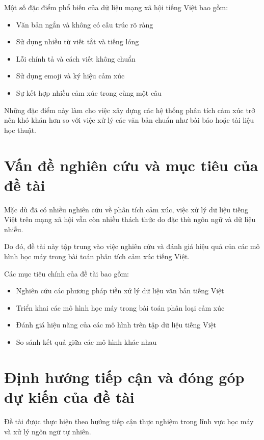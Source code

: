 \documentclass[14pt, a4paper]{report}
\begin{document}
Một số đặc điểm phổ biến của dữ liệu mạng xã hội tiếng Việt bao gồm:

\begin{itemize}
    \item Văn bản ngắn và không có cấu trúc rõ ràng
    \item Sử dụng nhiều từ viết tắt và tiếng lóng
    \item Lỗi chính tả và cách viết không chuẩn
    \item Sử dụng emoji và ký hiệu cảm xúc
    \item Sự kết hợp nhiều cảm xúc trong cùng một câu
\end{itemize}

Những đặc điểm này làm cho việc xây dựng các hệ thống phân tích cảm xúc trở nên khó khăn hơn so với việc xử lý các văn bản chuẩn như bài báo hoặc tài liệu học thuật.

\section{Vấn đề nghiên cứu và mục tiêu của đề tài}

Mặc dù đã có nhiều nghiên cứu về phân tích cảm xúc, việc xử lý dữ liệu tiếng Việt trên mạng xã hội vẫn còn nhiều thách thức do đặc thù ngôn ngữ và dữ liệu nhiễu.

Do đó, đề tài này tập trung vào việc nghiên cứu và đánh giá hiệu quả của các mô hình học máy trong bài toán phân tích cảm xúc tiếng Việt.

Các mục tiêu chính của đề tài bao gồm:

\begin{itemize}
    \item Nghiên cứu các phương pháp tiền xử lý dữ liệu văn bản tiếng Việt
    \item Triển khai các mô hình học máy trong bài toán phân loại cảm xúc
    \item Đánh giá hiệu năng của các mô hình trên tập dữ liệu tiếng Việt
    \item So sánh kết quả giữa các mô hình khác nhau
\end{itemize}

\section{Định hướng tiếp cận và đóng góp dự kiến của đề tài}

Đề tài được thực hiện theo hướng tiếp cận thực nghiệm trong lĩnh vực học máy và xử lý ngôn ngữ tự nhiên.
\end{document}
